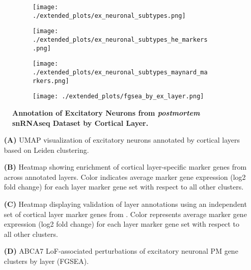 \begin{figure}[H]
    \begin{subfigure}[t]{.3\textwidth}
        \caption{}
        \texttt{[image: ./extended\_plots/ex\_neuronal\_subtypes.png]}        
    \end{subfigure}
    \begin{subfigure}[t]{.3\textwidth}
        \caption{}
        \texttt{[image: ./extended\_plots/ex\_neuronal\_subtypes\_he\_markers.png]}        
    \end{subfigure}
    \begin{subfigure}[t]{.3\textwidth}
        \caption{}
        \texttt{[image: ./extended\_plots/ex\_neuronal\_subtypes\_maynard\_markers.png]}        
    \end{subfigure}
    \begin{subfigure}[t]{0.8\textwidth}
        \caption{}
        \texttt{[image: ./extended\_plots/fgsea\_by\_ex\_layer.png]}        
    \end{subfigure}
    \caption{
        \textbf{Annotation of Excitatory Neurons from \textit{postmortem} snRNAseq Dataset by Cortical Layer.}\\
    }
    \label{fig:ex_layers}
\end{figure}
\begin{itemize}
    \item[\textbf{(A)}] UMAP visualization of excitatory neurons annotated by cortical layers based on Leiden clustering. 
    \item[\textbf{(B)}] Heatmap showing enrichment of cortical layer-specific marker genes from \cite{He2017-dq} across annotated layers. Color indicates average marker gene expression (log2 fold change) for each layer marker gene set with respect to all other clusters.    
    \item[\textbf{(C)}] Heatmap displaying validation of layer annotations using an independent set of cortical layer marker genes from \cite{Maynard2021-mz}. Color represents average marker gene expression (log2 fold change) for each layer marker gene set with respect to all other clusters.
    \item[\textbf{(D)}] ABCA7 LoF-associated perturbations of excitatory neuronal PM gene clusters by layer (FGSEA).
\end{itemize}